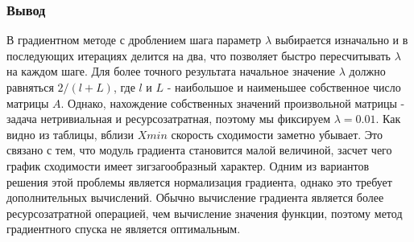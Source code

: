 \subsubsection{Вывод}
В градиентном методе с дроблением шага параметр $\lambda$ выбирается изначально и в последующих итерациях делится на два, что позволяет быстро пересчитывать $\lambda$ на каждом шаге.
Для более точного результата начальное значение $\lambda$ должно равняться {$2/(l + L)$}, где $l$ и $L$  - наибольшое и наименьшее собственное число матрицы $A$.
Однако, нахождение собственных значений произвольной матрицы - задача нетривиальная и ресурсозатратная, поэтому мы фиксируем $\lambda = 0.01$.
\newline
\newline
Как видно из таблицы, вблизи $Xmin$ скорость сходимости заметно убывает.
Это связано с тем, что модуль градиента становится малой величиной, засчет чего график сходимости имеет зигзагообразный характер.
Одним из вариантов решения этой проблемы является нормализация градиента, однако это требует дополнительных вычислений.
\newline
\newline
Обычно вычисление градиента является более ресурсозатратной операцией, чем вычисление значения функции, поэтому метод градиентного спуска не является оптимальным.

\newpage